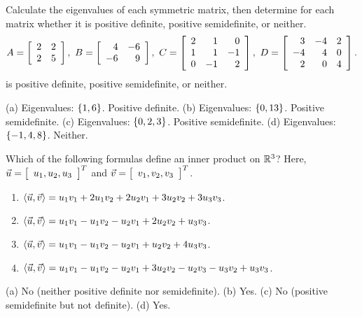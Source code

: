 \documentclass{ximera}
\begin{document}
\begin{exercise}
  Calculate the eigenvalues of each symmetric matrix, then determine
  for each matrix whether it is positive definite, positive
  semidefinite, or neither.
  \begin{equation*}
    A = \startmat{rr}
      2 & 2 \\
      2 & 5 \\
    \stopmat,\quad
    B = \startmat{rr}
      4  & -6 \\
      -6 &  9 \\
    \stopmat,\quad
    C = \startmat{rrr}
      2 &  1 &  0 \\
      1 &  1 & -1 \\
      0 & -1 &  2 \\
    \stopmat,\quad
    D = \startmat{rrr}
      3 & -4 &  2 \\
     -4 &  4 &  0 \\
      2 &  0 &  4 \\
    \stopmat.
  \end{equation*}
  is positive definite, positive semidefinite, or neither.
  \begin{solution}
    (a) Eigenvalues: $\set{1,6}$. Positive definite.
    (b) Eigenvalues: $\set{0,13}$. Positive semidefinite.
    (c) Eigenvalues: $\set{0,2,3}$. Positive semidefinite.
    (d) Eigenvalues: $\set{-1,4,8}$. Neither.
  \end{solution}
\end{exercise}

\begin{exercise}
  Which of the following formulas define an inner product on $\R^3$?
  Here, $\vect{u}=\startmat{c}u_1,u_2,u_3\stopmat^T$ and
  $\vect{v}=\startmat{c}v_1,v_2,v_3\stopmat^T$.
  \begin{enumerate}
  \item $\iprod{\vect{u},\vect{v}} = u_1v_1 + 2u_1v_2 + 2u_2v_1 + 3u_2v_2
    + 3u_3v_3$.
  \item $\iprod{\vect{u},\vect{v}} = u_1v_1 - u_1v_2 - u_2v_1 + 2u_2v_2
    + u_3v_3$.
  \item $\iprod{\vect{u},\vect{v}} = u_1v_1 - u_1v_2 - u_2v_1 + u_2v_2
    + 4u_3v_3$.
  \item $\iprod{\vect{u},\vect{v}} = u_1v_1 - u_1v_2 - u_2v_1 + 3u_2v_2
    - u_2v_3 - u_3v_2 + u_3v_3$.
  \end{enumerate}
  \begin{solution}
    (a) No (neither positive definite nor semidefinite).
    (b) Yes.
    (c) No (positive semidefinite but not definite).
    (d) Yes.
  \end{solution}
\end{exercise}
\end{document}
